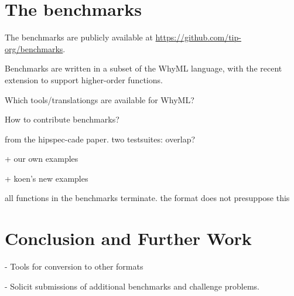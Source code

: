 \documentclass{llncs}
\begin{document}
\section{The benchmarks}

The benchmarks are publicly available at \url{https://github.com/tip-org/benchmarks}. 

Benchmarks are written in a subset of the WhyML language, with the recent extension to support higher-order functions.

Which tools/translationgs are available for WhyML?

How to contribute benchmarks?

from the hipspec-cade paper. two testsuites: overlap?

+ our own examples

+ koen's new examples

all functions in the benchmarks terminate. the format does not presuppose this

%
%
%
%

\section{Conclusion and Further Work}
- Tools for conversion to other formats

- Solicit submissions of additional benchmarks and challenge problems.



\end{document}
